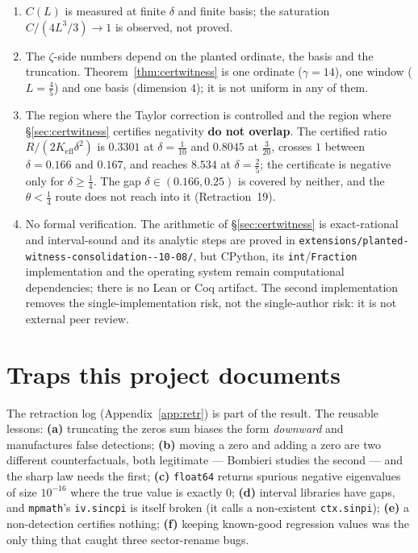 \documentclass[11pt,a4paper]{article}
\theoremstyle{definition}
\theoremstyle{remark}
\newcommand{\src}[1]{{\footnotesize\texttt{#1}}}
\begin{document}
\begin{enumerate}
method --- and not the basis either: in \src{src/zeta\_window.py} the frequency
$(2k+1)\pi/2L$ depends on $k$ and $L$ only, never on $N$, so at fixed $L$ the quarter-wave
bases are \emph{nested} and zero-padding the witness of \S\ref{sec:certwitness} to dimension
$8$ or $16$ gives the identical function and the identical certificate
(Retraction~20).
\item $C(L)$ is measured at finite $\delta$ and finite basis; the saturation
$C/(4L^{3}/3)\to1$ is observed, not proved.
\item The $\zeta$-side numbers depend on the planted ordinate, the basis and the truncation.
Theorem~\ref{thm:certwitness} is one ordinate ($\gamma=14$), one window ($L=\tfrac45$) and
one basis (dimension $4$); it is not uniform in any of them.
\item The region where the Taylor correction is controlled and the region where
\S\ref{sec:certwitness} certifies negativity \textbf{do not overlap}. The certified ratio
$R/(2K_{\mathrm{eff}}\delta^{2})$ is $0.3301$ at $\delta=\tfrac1{10}$ and $0.8045$ at
$\tfrac3{20}$, crosses $1$ between $\delta=0.166$ and $0.167$, and reaches $8.534$ at
$\delta=\tfrac25$; the certificate is negative only for $\delta\ge\tfrac14$. The gap
$\delta\in(0.166,0.25)$ is covered by neither, and the $\theta<\tfrac14$ route does not reach
into it (Retraction~19).
\item No formal verification. The arithmetic of \S\ref{sec:certwitness} is exact-rational and
interval-sound and its analytic steps are proved in
\src{extensions/planted-\allowbreak witness-\allowbreak consolidation-\allowbreak 2026-10-08/}, but CPython, its
\texttt{int}/\texttt{Fraction} implementation and the operating system remain computational
dependencies; there is no Lean or Coq artifact. The second implementation removes the
single-implementation risk, not the single-author risk: it is not external peer review.
\end{enumerate}

\section{Traps this project documents}\label{sec:traps}

The retraction log (Appendix~\ref{app:retr}) is part of the result. The reusable lessons:
\textbf{(a)} truncating the zeros sum biases the form \emph{downward} and manufactures false
detections; \textbf{(b)} moving a zero and adding a zero are two different counterfactuals,
both legitimate --- Bombieri studies the second --- and the sharp law needs the first;
\textbf{(c)} \texttt{float64} returns spurious negative eigenvalues of size $10^{-16}$ where
the true value is exactly $0$; \textbf{(d)} interval libraries have gaps, and
\texttt{mpmath}'s \texttt{iv.sincpi} is itself broken (it calls a non-existent
\texttt{ctx.sinpi}); \textbf{(e)} a non-detection certifies nothing; \textbf{(f)} keeping
known-good regression values was the only thing that caught three sector-rename bugs.
\end{document}
